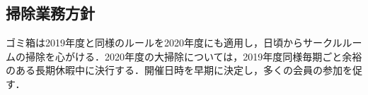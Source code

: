 \subsection*{掃除業務方針}
ゴミ箱は2019年度と同様のルールを2020年度にも適用し，日頃からサークルルームの掃除を心がける．2020年度の大掃除については，2019年度同様毎期ごと余裕のある長期休暇中に決行する．開催日時を早期に決定し，多くの会員の参加を促す．

